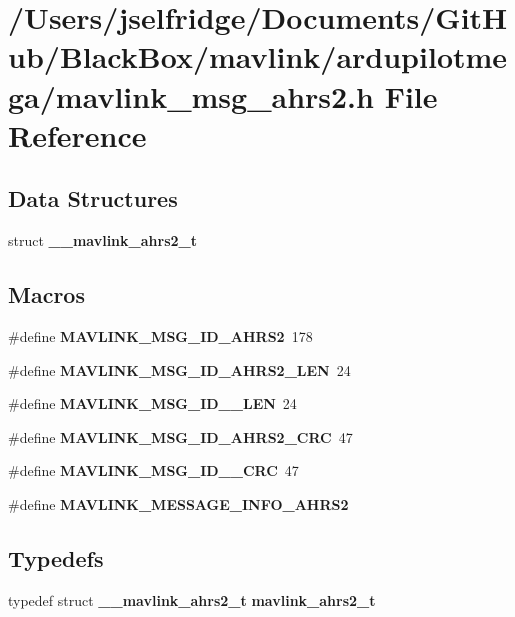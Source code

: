 \section{/\+Users/jselfridge/\+Documents/\+Git\+Hub/\+Black\+Box/mavlink/ardupilotmega/mavlink\+\_\+msg\+\_\+ahrs2.h File Reference}
\label{mavlink__msg__ahrs2_8h}
\subsection*{Data Structures}
\begin{DoxyCompactItemize}
\item 
struct \textbf{ \+\_\+\+\_\+mavlink\+\_\+ahrs2\+\_\+t}
\end{DoxyCompactItemize}
\subsection*{Macros}
\begin{DoxyCompactItemize}
\item 
\#define \textbf{ M\+A\+V\+L\+I\+N\+K\+\_\+\+M\+S\+G\+\_\+\+I\+D\+\_\+\+A\+H\+R\+S2}~178
\item 
\#define \textbf{ M\+A\+V\+L\+I\+N\+K\+\_\+\+M\+S\+G\+\_\+\+I\+D\+\_\+\+A\+H\+R\+S2\+\_\+\+L\+EN}~24
\item 
\#define \textbf{ M\+A\+V\+L\+I\+N\+K\+\_\+\+M\+S\+G\+\_\+\+I\+D\+\_\+\_\+\+L\+EN}~24
\item 
\#define \textbf{ M\+A\+V\+L\+I\+N\+K\+\_\+\+M\+S\+G\+\_\+\+I\+D\+\_\+\+A\+H\+R\+S2\+\_\+\+C\+RC}~47
\item 
\#define \textbf{ M\+A\+V\+L\+I\+N\+K\+\_\+\+M\+S\+G\+\_\+\+I\+D\+\_\+\_\+\+C\+RC}~47
\item 
\#define \textbf{ M\+A\+V\+L\+I\+N\+K\+\_\+\+M\+E\+S\+S\+A\+G\+E\+\_\+\+I\+N\+F\+O\+\_\+\+A\+H\+R\+S2}
\end{DoxyCompactItemize}
\subsection*{Typedefs}
\begin{DoxyCompactItemize}
\item 
typedef struct \textbf{ \+\_\+\+\_\+mavlink\+\_\+ahrs2\+\_\+t} \textbf{ mavlink\+\_\+ahrs2\+\_\+t}
\end{DoxyCompactItemize}


